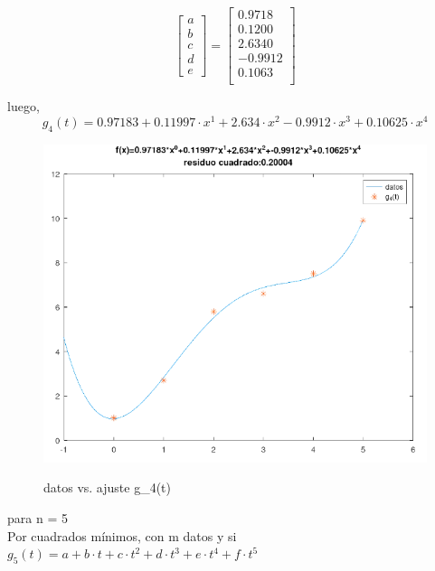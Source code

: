 \documentclass{article}
\begin{document}
\[
\begin{bmatrix}
    a \\ b \\ c \\ d \\ e
\end{bmatrix}
=
\begin{bmatrix}
   0.9718 \\
   0.1200 \\
   2.6340 \\
  -0.9912 \\
   0.1063 \\
\end{bmatrix}
\]

luego,
\[g_4(t)=0.97183+0.11997 \cdot x^1+2.634 \cdot x^2-0.9912 \cdot x^3+0.10625 \cdot x^4\]

\begin{figure}[H]
    \centering
    \includegraphics[width=0.6\linewidth]{grado.4.png}
    \label{fig:enter-label}
    \caption{datos vs. ajuste g_4(t)}
\end{figure}

para n = 5\\

Por cuadrados mínimos, con m datos y si 
$g_5(t)=a + b \cdot t + c \cdot t^2 + d \cdot t^3 + e \cdot t^4 + f \cdot t^5$\\
\end{document}
